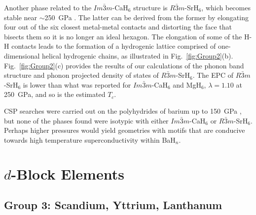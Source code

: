 \documentclass[12pt,letterpaper,oneside]{article}
\begin{document}
Another phase related to the $Im\bar{3}m$-CaH$_6$ structure is $R\bar{3}m$-SrH$_6$, which becomes stable near $\sim$250~GPa \cite{Hooper:2013,Wang:2015a}. The latter can be derived from the former by elongating four out of the six closest metal-metal contacts and distorting the face that bisects them so it is no longer an ideal hexagon. The elongation of some of the H-H contacts leads to the formation of a hydrogenic lattice comprised of one-dimensional helical hydrogenic chains, as illustrated in Fig.\ \ref{fig:Group2}(b). Fig.\ \ref{fig:Group2}(c) provides the results of our calculations of the phonon band structure and phonon projected density of states of $R\bar{3}m$-SrH$_6$. The EPC of $R\bar{3}m$-SrH$_6$ is lower than what was reported for $Im\bar{3}m$-CaH$_6$ and MgH$_6$, $\lambda=1.10$ at 250~GPa, and so is the estimated $T_c$.

CSP searches were carried out on the polyhydrides of barium up to 150~GPa \cite{Hooper:2012b}, but none of the phases found were isotypic with either $Im\bar{3}m$-CaH$_6$ or $R\bar{3}m$-SrH$_6$. Perhaps higher pressures would yield geometries with motifs that are conducive towards high temperature superconductivity within BaH$_n$.



\section{$d$-Block Elements}


\subsection{Group 3: Scandium, Yttrium, Lanthanum} 
\end{document}
